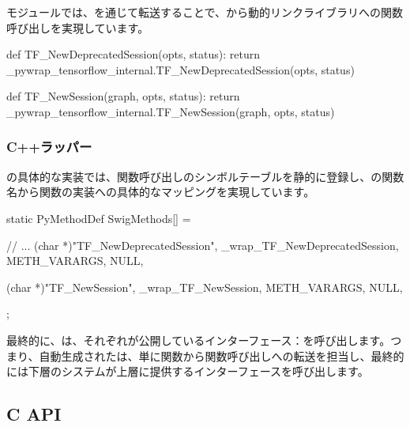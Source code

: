 \begin{content}
モジュールでは、を通じて転送することで、から動的リンクライブラリへの関数呼び出しを実現しています。

\begin{leftbar}
\begin{python}[caption={tensorflow/bazel-bin/tensorflow/python/pywrap\_tensorflow\_internal.py}]
def TF_NewDeprecatedSession(opts, status):
  return _pywrap_tensorflow_internal.TF_NewDeprecatedSession(opts, status)

def TF_NewSession(graph, opts, status):
  return _pywrap_tensorflow_internal.TF_NewSession(graph, opts, status)
\end{python}
\end{leftbar}

\subsubsection{C++ラッパー}

の具体的な実装では、関数呼び出しのシンボルテーブルを静的に登録し、の関数名から\cpp{}関数の実装への具体的なマッピングを実現しています。

\begin{leftbar}
\begin{c++}[caption={tensorflow/bazel-bin/tensorflow/python/pywrap\_tensorflow\_internal.cc}]
static PyMethodDef SwigMethods[] = {
  // ...
  { (char *)"TF_NewDeprecatedSession", 
    _wrap_TF_NewDeprecatedSession, METH_VARARGS, NULL},

  { (char *)"TF_NewSession", 
    _wrap_TF_NewSession, METH_VARARGS, NULL},
};
\end{c++}
\end{leftbar}

最終的に、は、それぞれが公開しているインターフェース：を呼び出します。つまり、自動生成されたは、単に関数から関数呼び出しへの転送を担当し、最終的には下層のシステムが上層に提供するインターフェースを呼び出します。

\subsection{C API}


\end{content}
